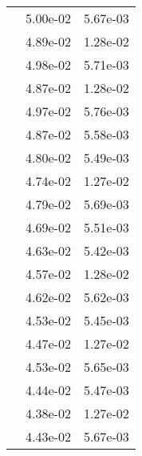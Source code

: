 \begin{table}
\begin{tabular}{c|cc|}
\multicolumn{1}{|c|}{} & \multicolumn{1}{|c|}{  5.00e-02} & \multicolumn{1}{|c|}{  5.67e-03} \\ 
\multicolumn{1}{|c|}{} & \multicolumn{1}{|c|}{  4.89e-02} & \multicolumn{1}{|c|}{  1.28e-02} \\ 
\multicolumn{1}{|c|}{} & \multicolumn{1}{|c|}{  4.98e-02} & \multicolumn{1}{|c|}{  5.71e-03} \\ 
\multicolumn{1}{|c|}{} & \multicolumn{1}{|c|}{  4.87e-02} & \multicolumn{1}{|c|}{  1.28e-02} \\ 
\multicolumn{1}{|c|}{} & \multicolumn{1}{|c|}{  4.97e-02} & \multicolumn{1}{|c|}{  5.76e-03} \\ 
\multicolumn{1}{|c|}{} & \multicolumn{1}{|c|}{  4.87e-02} & \multicolumn{1}{|c|}{  5.58e-03} \\ 
\multicolumn{1}{|c|}{} & \multicolumn{1}{|c|}{  4.80e-02} & \multicolumn{1}{|c|}{  5.49e-03} \\ 
\multicolumn{1}{|c|}{} & \multicolumn{1}{|c|}{  4.74e-02} & \multicolumn{1}{|c|}{  1.27e-02} \\ 
\multicolumn{1}{|c|}{} & \multicolumn{1}{|c|}{  4.79e-02} & \multicolumn{1}{|c|}{  5.69e-03} \\ 
\multicolumn{1}{|c|}{} & \multicolumn{1}{|c|}{  4.69e-02} & \multicolumn{1}{|c|}{  5.51e-03} \\ 
\multicolumn{1}{|c|}{} & \multicolumn{1}{|c|}{  4.63e-02} & \multicolumn{1}{|c|}{  5.42e-03} \\ 
\multicolumn{1}{|c|}{} & \multicolumn{1}{|c|}{  4.57e-02} & \multicolumn{1}{|c|}{  1.28e-02} \\ 
\multicolumn{1}{|c|}{} & \multicolumn{1}{|c|}{  4.62e-02} & \multicolumn{1}{|c|}{  5.62e-03} \\ 
\multicolumn{1}{|c|}{} & \multicolumn{1}{|c|}{  4.53e-02} & \multicolumn{1}{|c|}{  5.45e-03} \\ 
\multicolumn{1}{|c|}{} & \multicolumn{1}{|c|}{  4.47e-02} & \multicolumn{1}{|c|}{  1.27e-02} \\ 
\multicolumn{1}{|c|}{} & \multicolumn{1}{|c|}{  4.53e-02} & \multicolumn{1}{|c|}{  5.65e-03} \\ 
\multicolumn{1}{|c|}{} & \multicolumn{1}{|c|}{  4.44e-02} & \multicolumn{1}{|c|}{  5.47e-03} \\ 
\multicolumn{1}{|c|}{} & \multicolumn{1}{|c|}{  4.38e-02} & \multicolumn{1}{|c|}{  1.27e-02} \\ 
\multicolumn{1}{|c|}{} & \multicolumn{1}{|c|}{  4.43e-02} & \multicolumn{1}{|c|}{  5.67e-03} \\ 

\end{tabular}
\end{table}
